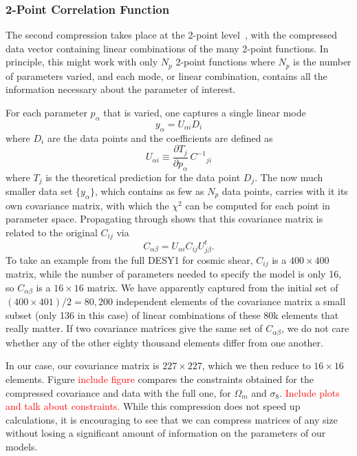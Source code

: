 \documentclass[twocolumn]{\docclass}
\newcommand\be{\begin{equation}}
\newcommand\ee{\end{equation}}
\begin{document}
\subsubsection{2-Point Correlation Function}

The second compression takes place at the 2-point level~\citep{Zablocki:2015zcm}, with the compressed data vector containing linear combinations of the many 2-point functions. In principle, this might work with only $N_p$ 2-point functions where $N_p$ is the number of parameters varied, and each mode, or linear combination, contains all the information necessary about the parameter of interest. 

For each parameter $p_\alpha$ that is varied, one captures a single linear mode
\be
y_\alpha = U_{\alpha i} D_i
\ee
where $D_i$ are the data points and the coefficients are defined as
\be \label{eq:compression_scheme}
U_{\alpha i} \equiv \frac{\partial T_j}{\partial p_\alpha} \, C^{-1}{}_{ji}
\ee
where $T_j$ is the theoretical prediction for the data point $D_j$.
The now much smaller data set $\{y_\alpha\}$, which contains as few as $N_p$ data points, carries with it its own covariance matrix, with which the $\chi^2$ can be computed for each point in parameter space. Propagating through shows that this covariance matrix is related to the original $C_{ij}$ via
\be
C_{\alpha\beta} = U_{\alpha i} C_{ij} U^t_{j\beta}.
\ee
To take an example from the full DESY1 for cosmic shear, $C_{ij}$ is a $400 \times 400$ matrix, while the number of parameters needed to specify the model is only 16, so $C_{\alpha\beta}$ is a $16\times 16$ matrix. We have apparently captured from the initial set of $(400 \times 401)/2 = 80,200$ independent elements of the covariance matrix a small subset (only 136 in this case) of linear combinations of these 80k elements that really matter. If two covariance matrices give the same set of $C_{\alpha\beta}$, we do not care whether any of the other eighty thousand elements differ from one another.

In our case, our covariance matrix is  $227 \times 227$, which we then reduce to $16 \times 16$ elements. Figure \textcolor{red}{include figure} compares the constraints obtained for the compressed covariance and data with the full one, for $\Omega_m$ and $\sigma_8$.  \textcolor{red}{Include plots and talk about constraints.} While this compression does not speed up calculations, it is encouraging to see that we can compress matrices of any size without losing a significant amount of information on the parameters of our models. 
\end{document}
